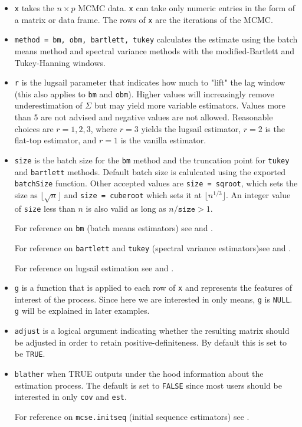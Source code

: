 \documentclass[11pt]{article}\usepackage[]{graphicx}\usepackage[]{color}
\begin{document}
\begin{itemize}
	\item \texttt{x} takes the $n \times p$ MCMC data. \texttt{x} can take only numeric entries in the form of a matrix or data frame. The rows of \texttt{x} are the iterations of the MCMC.

	\item \texttt{method = bm, obm, bartlett, tukey} calculates the estimate using the batch means method and spectral variance methods with the modified-Bartlett and Tukey-Hanning windows.
	
	\item \texttt{r} is the lugsail parameter that indicates how much to "lift" the lag window (this also  applies to \texttt{bm} and \texttt{obm}). Higher values will increasingly remove underestimation of $\Sigma$ but may yield more variable estimators. Values more than 5 are not advised and negative values are not allowed. Reasonable choices are $r = 1, 2, 3$, where $r = 3$ yields the lugsail estimator, $r = 2$ is the flat-top estimator, and $r = 1$ is the vanilla estimator. 

	\item \texttt{size} is the batch size for the \texttt{bm} method and the truncation point for \texttt{tukey} and \texttt{bartlett} methods. Default batch size is calulcated using the exported \texttt{batchSize} function. Other accepted values are \texttt{size = sqroot}, which sets the size as $\lfloor \sqrt{n} \rfloor$ and \texttt{size = cuberoot} which sets it at $\lfloor n^{1/3} \rfloor$. An integer value of \texttt{size} less than $n$ is also valid as long as $n/\texttt{size} > 1$.
	
For reference on \texttt{bm} (batch means estimators) see \cite{jones2006fixed} and \cite{vats:fleg:jones:2017b}.

For reference on \texttt{bartlett} and \texttt{tukey} (spectral variance estimators)see \cite{flegal2010batch} and \cite{vats2015strong}.

For reference on lugsail estimation see \cite{liu:fleg:2018} and \cite{vats:fleg:2018}.

	\item \texttt{g} is a function that is applied to each row of \texttt{x} and represents the features of interest of the process. Since here we are interested in only means, \texttt{g} is \texttt{NULL}. \texttt{g} will be explained in later examples.
	
	\item \texttt{adjust} is a logical argument indicating whether the resulting matrix should be adjusted in order to retain positive-definiteness. By default this is set to be \texttt{TRUE}.
	
	\item \texttt{blather} when TRUE outputs under the hood information about the estimation process. The default is set to \texttt{FALSE} since most users should be interested in only \texttt{cov} and \texttt{est}.
	
For reference on \texttt{mcse.initseq} (initial sequence estimators) see \cite{dai2017multivariate}.
\end{itemize}
\end{document}
